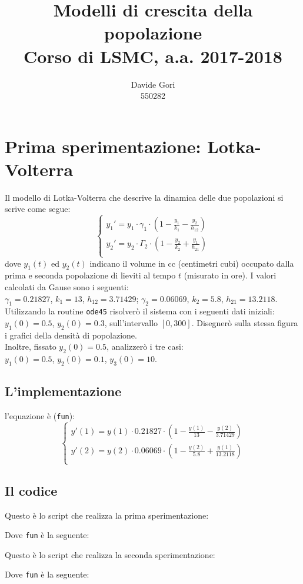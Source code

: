 \documentclass{article}
\title{Modelli di crescita della popolazione\\
	Corso di LSMC, a.a. 2017-2018}
\author{Davide Gori\\
	550282}
\begin{document}
	\maketitle
	\section{Prima sperimentazione: Lotka-Volterra}
	Il modello di Lotka-Volterra che descrive la dinamica delle due popolazioni si scrive come segue:
		\begin{equation}
	\begin{cases}
	y_1' = y_1 \cdot \gamma_1 \cdot (1-\frac{y_1}{k_1}-\frac{y_2}{h_12}) \\
	y_2' = y_2 \cdot \Gamma_2 \cdot (1-\frac{y_2}{k_2}+\frac{y_1}{h_21}) \\
	\end{cases}
	\end{equation}
	dove $y_1(t)$ ed $y_2(t)$ indicano il volume in cc (centimetri cubi) occupato dalla prima e seconda popolazione di lieviti al tempo $t$ (misurato in ore). I valori calcolati da Gause sono i seguenti:\\
	$\gamma_1 = 0.21827$, $k_1 = 13$, $h_12 = 3.71429$; $\gamma_2 = 0.06069$, $k_2 = 5.8$, $h_21 = 13.2118$.\\
	Utilizzando la routine {\tt ode45} risolverò il sistema con i seguenti dati iniziali: $y_1(0) = 0.5$, $y_2(0) = 0.3$, sull'intervallo $\left[0, 300\right]$. Disegnerò sulla stessa figura i grafici della densità di popolazione.\\
	Inoltre, fissato $y_2(0) = 0.5$, analizzerò i tre casi:\\
	$y_1(0) = 0.5$, $y_2(0) = 0.1$, $y_3(0) = 10$.
	
	\subsection{L'implementazione}
	l'equazione è ({\tt fun}):
	\begin{equation}
	\begin{cases}
	y'(1) = y(1) \cdot 0.21827 \cdot (1-\frac{y(1)}{13}-\frac{y(2)}{3.71429}) \\
	y'(2) = y(2) \cdot 0.06069 \cdot (1-\frac{y(2)}{5.8}+\frac{y(1)}{13.2118}) \\
	\end{cases}
	\end{equation}
	\subsection{Il codice}
	Questo è lo script che realizza la prima sperimentazione:
	
	Dove {\tt fun} è la seguente:
	
	Questo è lo script che realizza la seconda sperimentazione:
	
	Dove {\tt fun} è la seguente:
	
	
\end{document}
